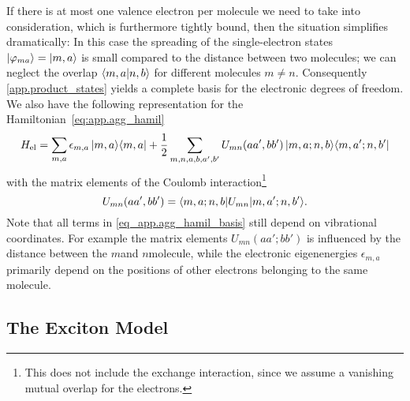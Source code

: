 If there is at most one valence electron per molecule we need to take into consideration, which is furthermore tightly bound, then the situation simplifies dramatically:
In this case the spreading of the single-electron states $| \varphi_{ma} \rangle = | m, a \rangle$ is small compared to the distance between two molecules; we can neglect the overlap $\langle m, a | n, b \rangle$ for different molecules $m \neq n$.
Consequently \autoref{app.product_states} yields a complete basis for the electronic degrees of freedom.
We also have the following representation for the Hamiltonian~\ref{eq:app.agg_hamil}%
\begin{equation}
  H_\mathrm{el} = \sum_{m, a} \epsilon_{m, a} \, | m, a \rangle\langle m, a | + \frac{1}{2}\sum_{m,n,a,b,a',b'} U_{mn}(aa', bb') \, | m,a; n,b \rangle\langle m,a'; n,b' |
  \label{eq:app.agg_hamil_basis}
\end{equation}
with the matrix elements of the Coulomb interaction\footnote{%
  This does not include the exchange interaction, since we assume a vanishing mutual overlap for the electrons.
}
\begin{equation*}
  U_{mn}(aa', bb') = \langle m,a; n,b | U_{mn} | m,a'; n,b' \rangle.
\end{equation*}
Note that all terms in \autoref{eq_app.agg_hamil_basis} still depend on vibrational coordinates.
For example the matrix elements $U_{mn}(aa'; bb')$ is influenced by the distance between the $m$\th and $n$\th molecule, while the electronic eigenenergies $\epsilon_{m, a}$ primarily depend on the positions of other electrons belonging to the same molecule.

\subsection{The Exciton Model}
\label{sub:app.model.exciton}
%

